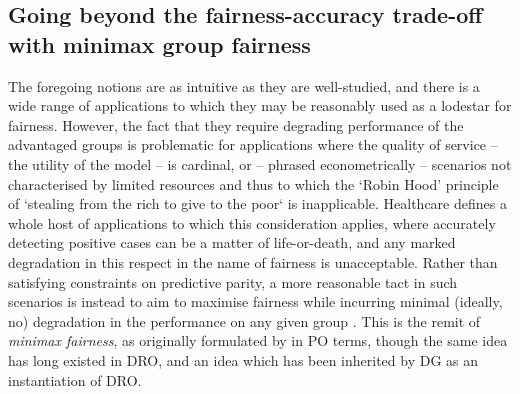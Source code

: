 \subsection{Going beyond the fairness-accuracy trade-off with minimax group
fairness}\label{ssec:minimax-fairness}
The foregoing notions are as intuitive as they are well-studied, and there is a wide
range of applications to which they may be reasonably used as a lodestar for fairness.
%
However, the fact that they require degrading performance of the advantaged groups is problematic
for applications where the quality of service -- the utility of the model -- is cardinal, or --
phrased econometrically -- scenarios not characterised by limited resources  and thus to which the
`Robin Hood' principle of `stealing from the rich to give to the poor` is inapplicable.
%
Healthcare defines a whole host of applications to which this consideration applies, where
accurately detecting positive cases can be a matter of life-or-death, and any marked degradation in
this respect in the name of fairness is unacceptable. 
%
Rather than satisfying constraints on predictive parity, a more reasonable tact in such scenarios
is instead to aim to maximise fairness while incurring minimal (ideally, no) degradation in the
performance on any given group \citep{ustun2019fairness}.
%
This is the remit of \emph{minimax fairness}, as originally formulated by
\citep{martinez2020minimax} in \acf{PO} terms, though the same idea has long existed in \acf{DRO},
and an idea which has been inherited by \ac{DG} as an instantiation of \ac{DRO}. 
%

